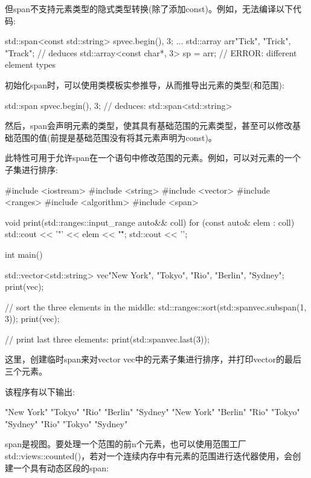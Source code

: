 但span不支持元素类型的隐式类型转换(除了添加const)。例如，无法编译以下代码:

\begin{cpp}
std::span<const std::string> sp{vec.begin(), 3};
...
std::array arr{"Tick", "Trick", "Track"}; // deduces std::array<const char*, 3>
sp = arr; // ERROR: different element types
\end{cpp}


初始化span时，可以使用类模板实参推导，从而推导出元素的类型(和范围):

\begin{cpp}
std::span sp{vec.begin(), 3}; // deduces: std::span<std::string>
\end{cpp}

然后，span会声明元素的类型，使其具有基础范围的元素类型，甚至可以修改基础范围的值(前提是基础范围没有将其元素声明为const)。

此特性可用于允许span在一个语句中修改范围的元素。例如，可以对元素的一个子集进行排序:


\begin{cpp}
#include <iostream>
#include <string>
#include <vector>
#include <ranges>
#include <algorithm>
#include <span>

void print(std::ranges::input_range auto&& coll)
{
	for (const auto& elem : coll) {
		std::cout << '"' << elem << "\" ";
	}
	std::cout << '\n';
}

int main()
{
	std::vector<std::string> vec{"New York", "Tokyo", "Rio", "Berlin", "Sydney"};
	print(vec);

	// sort the three elements in the middle:
	std::ranges::sort(std::span{vec}.subspan(1, 3));
	print(vec);

	// print last three elements:
	print(std::span{vec}.last(3));
}
\end{cpp}

这里，创建临时span来对vector vec中的元素子集进行排序，并打印vector的最后三个元素。

该程序有以下输出:

\begin{shell}
"New York" "Tokyo" "Rio" "Berlin" "Sydney"
"New York" "Berlin" "Rio" "Tokyo" "Sydney"
"Rio" "Tokyo" "Sydney"
\end{shell}

span是视图。要处理一个范围的前n个元素，也可以使用范围工厂std::views::counted()，若对一个连续内存中有元素的范围进行迭代器使用，会创建一个具有动态区段的span:

